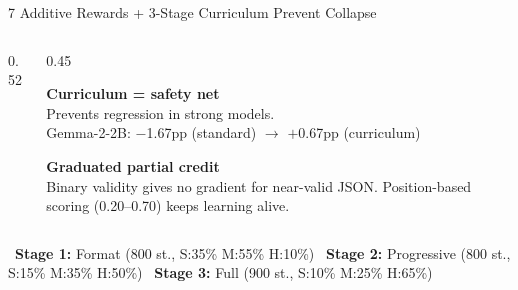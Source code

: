 \documentclass[10pt, aspectratio=169]{beamer}
\begin{document}
\begin{frame}{7 Additive Rewards + 3-Stage Curriculum Prevent Collapse}
\begin{columns}[T]
\begin{column}{0.52\textwidth}
\begin{tcolorbox}[tablecard]
      \end{tcolorbox}
    \end{column}
    \begin{column}{0.45\textwidth}
      \begin{tcolorbox}[insightbox=accent]
        \scriptsize\textbf{Curriculum = safety net}\\[3pt]
        Prevents regression in strong models.\\
        Gemma-2-2B: \textcolor{warn}{$-$1.67pp} (standard) $\to$ \textcolor{accent}{$+$0.67pp} (curriculum)
      \end{tcolorbox}
      \vspace{0.3em}
      \begin{tcolorbox}[insightbox=sky]
        \scriptsize\textbf{Graduated partial credit}\\[3pt]
        Binary validity gives no gradient for near-valid JSON.
        Position-based scoring (0.20--0.70) keeps learning alive.
      \end{tcolorbox}
    \end{column}
  \end{columns}

  \vspace{0.3em}
  \centering
  \scriptsize
  \textcolor{accent}{\faPlayCircle}~\textbf{Stage 1:} Format {\tiny(800 st., S:35\% M:55\% H:10\%)}
  \quad\textcolor{textsecondary}{\faAngleRight}\quad
  \textcolor{gold}{\faPlayCircle}~\textbf{Stage 2:} Progressive {\tiny(800 st., S:15\% M:35\% H:50\%)}
  \quad\textcolor{textsecondary}{\faAngleRight}\quad
  \textcolor{warn}{\faPlayCircle}~\textbf{Stage 3:} Full {\tiny(900 st., S:10\% M:25\% H:65\%)}
\end{frame}
\end{document}
